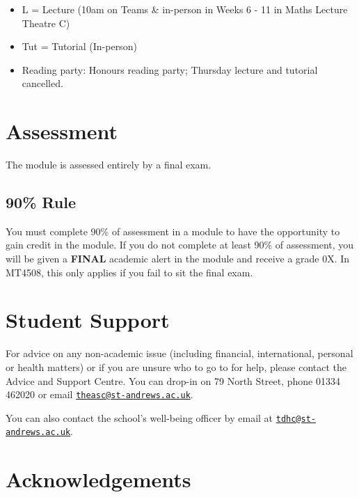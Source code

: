 \documentclass[
  a4paper,
  oneside,
  final]{krantz}
\providecommand{\tightlist}{%
  \setlength{\itemsep}{0pt}\setlength{\parskip}{0pt}}
\theoremstyle{definition}
\theoremstyle{definition}
\theoremstyle{definition}
\theoremstyle{definition}
\theoremstyle{remark}
\begin{document}
\begin{table}[ht]
\begin{centerbox}
\begin{threeparttable}
\end{threeparttable}\par\end{centerbox}

\end{table}
 

\begin{itemize}
\tightlist
\item
  L = Lecture (10am on Teams \& in-person in Weeks 6 - 11 in Maths Lecture Theatre C)
\item
  Tut = Tutorial (In-person)
\item
  Reading party: Honours reading party; Thursday lecture and tutorial cancelled.
\end{itemize}

\hypertarget{assessment}{%
\section*{Assessment}\label{assessment}}


The module is assessed entirely by a final exam.

\hypertarget{rule}{%
\subsection*{90\% Rule}\label{rule}}


You must complete 90\% of assessment in a module to have the opportunity to gain credit in the module. If you do not complete at least 90\% of assessment, you will be given a \textbf{FINAL} academic alert in the module and receive a grade 0X. In MT4508, this only applies if you fail to sit the final exam.

\hypertarget{student-support}{%
\section*{Student Support}\label{student-support}}


For advice on any non-academic issue (including financial, international, personal or health matters) or if you are unsure who to go to for help, please contact the Advice and Support Centre. You can drop-in on 79 North Street, phone 01334 462020 or email \href{mailto:theasc@st-andrews.ac.uk}{\nolinkurl{theasc@st-andrews.ac.uk}}.

You can also contact the school's well-being officer by email at \href{mailto:tdhc@st-andrews.ac.uk}{\nolinkurl{tdhc@st-andrews.ac.uk}}.

\hypertarget{acknowledgements}{%
\section*{Acknowledgements}\label{acknowledgements}}
\end{document}
